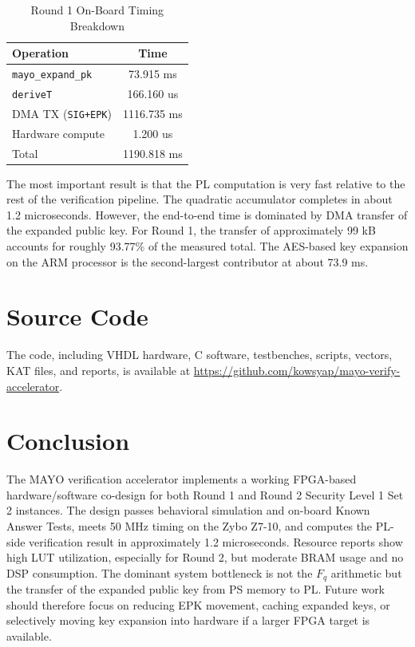 \documentclass[conference]{IEEEtran}
\begin{document}
\begin{table}[t]
\centering
\caption{Round 1 On-Board Timing Breakdown}
\label{tab:perf}
\begin{tabular}{lc}
\toprule
Operation & Time \\
\midrule
\texttt{mayo\_expand\_pk} & 73.915 ms \\
\texttt{deriveT} & 166.160 us \\
DMA TX (\texttt{SIG+EPK}) & 1116.735 ms \\
Hardware compute & 1.200 us \\
Total & 1190.818 ms \\
\bottomrule
\end{tabular}
\end{table}

The most important result is that the PL computation is very fast relative to the rest of the verification pipeline. The quadratic accumulator completes in about 1.2 microseconds. However, the end-to-end time is dominated by DMA transfer of the expanded public key. For Round 1, the transfer of approximately 99 kB accounts for roughly 93.77\% of the measured total. The AES-based key expansion on the ARM processor is the second-largest contributor at about 73.9 ms.

\section{Source Code}
The code, including VHDL hardware, C software, testbenches, scripts, vectors, KAT files, and reports, is available at \url{https://github.com/kowsyap/mayo-verify-accelerator}.

\section{Conclusion}
The MAYO verification accelerator implements a working FPGA-based hardware/software co-design for both Round 1 and Round 2 Security Level 1 Set 2 instances. The design passes behavioral simulation and on-board Known Answer Tests, meets 50 MHz timing on the Zybo Z7-10, and computes the PL-side verification result in approximately 1.2 microseconds. Resource reports show high LUT utilization, especially for Round 2, but moderate BRAM usage and no DSP consumption. The dominant system bottleneck is not the \(F_q\) arithmetic but the transfer of the expanded public key from PS memory to PL. Future work should therefore focus on reducing EPK movement, caching expanded keys, or selectively moving key expansion into hardware if a larger FPGA target is available.
\end{document}
